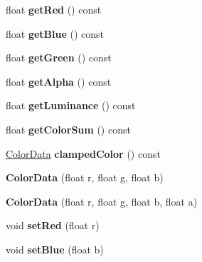 \begin{DoxyCompactItemize}
\item 
\hypertarget{classColorData_ab7066467c08dfad868fc4b1add70c2f2}{float {\bfseries get\-Red} () const }\label{classColorData_ab7066467c08dfad868fc4b1add70c2f2}

\item 
\hypertarget{classColorData_ad9c600256c8abefdd76209fc1f68fcb5}{float {\bfseries get\-Blue} () const }\label{classColorData_ad9c600256c8abefdd76209fc1f68fcb5}

\item 
\hypertarget{classColorData_a7e2e03b8e1e3270f33c4e4a69c00dbd6}{float {\bfseries get\-Green} () const }\label{classColorData_a7e2e03b8e1e3270f33c4e4a69c00dbd6}

\item 
\hypertarget{classColorData_a198c4490b4f1c512d2bc174418dc892a}{float {\bfseries get\-Alpha} () const }\label{classColorData_a198c4490b4f1c512d2bc174418dc892a}

\item 
\hypertarget{classColorData_ae6a0100e4e5fe7bbd00fb4defd6e4a43}{float {\bfseries get\-Luminance} () const }\label{classColorData_ae6a0100e4e5fe7bbd00fb4defd6e4a43}

\item 
\hypertarget{classColorData_a3f0f9e50c730eb653efd800070cf448c}{float {\bfseries get\-Color\-Sum} () const }\label{classColorData_a3f0f9e50c730eb653efd800070cf448c}

\item 
\hypertarget{classColorData_a5479f50514f714dc9c738a50b7b86365}{\hyperlink{classColorData}{Color\-Data} {\bfseries clamped\-Color} () const }\label{classColorData_a5479f50514f714dc9c738a50b7b86365}

\item 
\hypertarget{classColorData_a920b0332685ef72147fe19020fdac5d6}{{\bfseries Color\-Data} (float r, float g, float b)}\label{classColorData_a920b0332685ef72147fe19020fdac5d6}

\item 
\hypertarget{classColorData_a0ecce2c6c597d9379ebb329883298dfd}{{\bfseries Color\-Data} (float r, float g, float b, float a)}\label{classColorData_a0ecce2c6c597d9379ebb329883298dfd}

\item 
\hypertarget{classColorData_aa2e401956936f87a560b8f579514bf69}{void {\bfseries set\-Red} (float r)}\label{classColorData_aa2e401956936f87a560b8f579514bf69}

\item 
\hypertarget{classColorData_a01bbba90cac0bc1b3bd01d4aecc16477}{void {\bfseries set\-Blue} (float b)}\label{classColorData_a01bbba90cac0bc1b3bd01d4aecc16477}


\end{DoxyCompactItemize}

